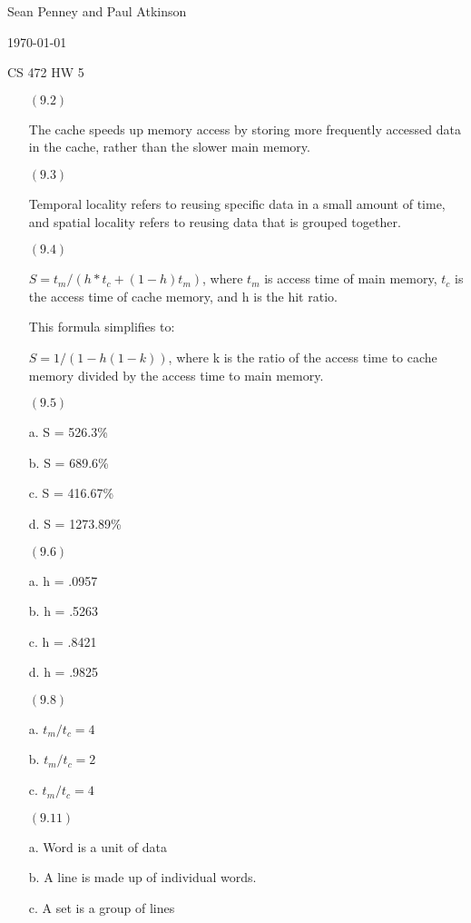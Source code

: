 \documentclass[letterpaper,10pt,titlepage]{article}
\def\name{Sean Penney and Paul Atkinson}
\begin{document}
\hfill \name

\hfill \today

\hfill CS 472 HW 5

\begin{enumerate}
\item[$(9.2)$] 

  The cache speeds up memory access by storing more frequently accessed data in the cache, rather than the slower main memory.

\item[$(9.3)$]

  Temporal locality refers to reusing specific data in a small amount of time, and spatial locality refers to reusing data that is grouped together.    

\item[$(9.4)$]

  $S = t_{m} / (h * t_{c} + (1 - h)t_{m})$, where $t_{m}$ is access time of main memory, $t_{c}$ is the access time of cache memory, and h is the hit ratio.
 
  This formula simplifies to:
 
  $S = 1 / (1 - h(1 - k))$, where k is the ratio of the access time to cache memory divided by the access time to main memory.
  
\item[$(9.5)$]
  
  a.  S = 526.3\%
 
  b.  S = 689.6\%
 
  c.  S = 416.67\%
 
  d.  S = 1273.89\%
  
\item[$(9.6)$]

  a.  h = .0957
 
  b.  h = .5263
 
  c.  h = .8421
 
  d.  h = .9825

\item[$(9.8)$]
  
  a. $t_{m} / t_{c} = 4$
  
  b. $t_{m} / t_{c} = 2$
  
  c. $t_{m} / t_{c} = 4$
  
\item[$(9.11)$]   
  
  a.  Word is a unit of data
  
  b.  A line is made up of individual words.
  
  c.  A set is a group of lines
  

\end{enumerate}
\end{document}
